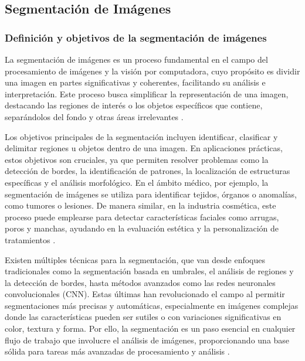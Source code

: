 \subsection{Segmentación de Imágenes}
\subsubsection{Definición y objetivos de la segmentación de imágenes}
La segmentación de imágenes es un proceso fundamental en el campo del procesamiento de imágenes y la visión por computadora, cuyo propósito es dividir una imagen en partes significativas y coherentes, facilitando su análisis e interpretación. Este proceso busca simplificar la representación de una imagen, destacando las regiones de interés o los objetos específicos que contiene, separándolos del fondo y otras áreas irrelevantes \parencite{gonzalez2018}.

Los objetivos principales de la segmentación incluyen identificar, clasificar y delimitar regiones u objetos dentro de una imagen. En aplicaciones prácticas, estos objetivos son cruciales, ya que permiten resolver problemas como la detección de bordes, la identificación de patrones, la localización de estructuras específicas y el análisis morfológico. En el ámbito médico, por ejemplo, la segmentación de imágenes se utiliza para identificar tejidos, órganos o anomalías, como tumores o lesiones. De manera similar, en la industria cosmética, este proceso puede emplearse para detectar características faciales como arrugas, poros y manchas, ayudando en la evaluación estética y la personalización de tratamientos \parencite{gonzalez2018}.

Existen múltiples técnicas para la segmentación, que van desde enfoques tradicionales como la segmentación basada en umbrales, el análisis de regiones y la detección de bordes, hasta métodos avanzados como las redes neuronales convolucionales (CNN). Estas últimas han revolucionado el campo al permitir segmentaciones más precisas y automáticas, especialmente en imágenes complejas donde las características pueden ser sutiles o con variaciones significativas en color, textura y forma. Por ello, la segmentación es un paso esencial en cualquier flujo de trabajo que involucre el análisis de imágenes, proporcionando una base sólida para tareas más avanzadas de procesamiento y análisis \parencite{gonzalez2018}.
